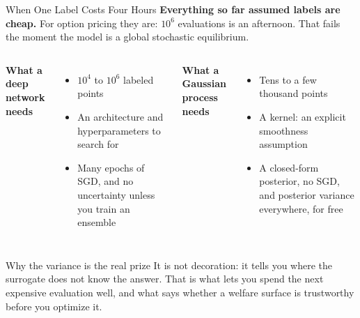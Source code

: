 \documentclass[aspectratio=169,11pt]{beamer}
\newcommand{\emphc}[1]{\textcolor{harvardcrimson}{#1}}
\begin{document}
\begin{frame}{When One Label Costs Four Hours}
\small
\textbf{Everything so far assumed labels are cheap.} For option pricing they are: $10^6$ evaluations is an afternoon. \emphc{That fails the moment the model is a global stochastic equilibrium.}

\vspace{0.15cm}
\begin{columns}[T]
\textbf{What a deep network needs}
\begin{itemize}\itemsep1pt
  \item $10^4$ to $10^6$ labeled points
  \item An architecture and hyperparameters to search for
  \item Many epochs of SGD, and no uncertainty unless you train an ensemble
\end{itemize}

\textbf{What a Gaussian process needs}
\begin{itemize}\itemsep1pt
  \item Tens to a few thousand points
  \item A kernel: an explicit smoothness assumption
  \item A closed-form posterior, no SGD, and \emphc{posterior variance everywhere, for free}
\end{itemize}
\end{columns}

\vspace{0.2cm}
\begin{alertblock}{Why the variance is the real prize}
It is not decoration: it tells you \emphc{where the surrogate does not know the answer}. That is what lets you spend the next expensive evaluation well, and what says whether a welfare surface is trustworthy before you optimize it.
\end{alertblock}
\end{frame}
\end{document}
